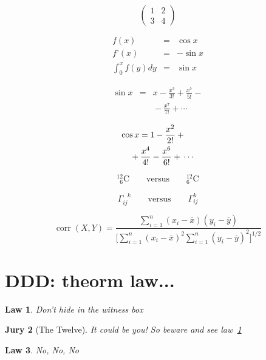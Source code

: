 \documentclass{article}
\begin{document}
\begin{displaymath}
\left(\begin{array}{c|c}
1 & 2 \\
\hline
3 & 4
\end{array}\right)
\end{displaymath}

\begin{eqnarray}
f(x) & = & \cos x
\\
f’(x) & = & -\sin x
\\
\int_{0}^{x} f(y)dy &
= & \sin x
\end{eqnarray}

{\setlength\arraycolsep{2pt}
\begin{eqnarray}
\sin x & = & x -\frac{x^{3}}{3!}
+\frac{x^{5}}{5!}-{}
\nonumber\\
& & {}-\frac{x^{7}}{7!}+{}\cdots
\end{eqnarray}}

\begin{eqnarray}
\lefteqn{ \cos x = 1
-\frac{x^{2}}{2!} +{} }
\nonumber\\
& & {}+\frac{x^{4}}{4!}
-\frac{x^{6}}{6!}+{}\cdots
\end{eqnarray}

\begin{displaymath}
{}^{12}_{\phantom{1}6}\textrm{C}
\qquad \textrm{versus} \qquad
{}^{12}_{6}\textrm{C}
\end{displaymath}


\begin{displaymath}
\Gamma_{ij}^{\phantom{ij}k}
\qquad \textrm{versus} \qquad
\Gamma_{ij}^{k}
\end{displaymath}

\begin{displaymath}
\mathop{\mathrm{corr}}(X,Y)=
\frac{\displaystyle
\sum_{i=1}^n(x_i-\overline x)
(y_i-\overline y)}
{\displaystyle\biggl[
\sum_{i=1}^n(x_i-\overline x)^2
\sum_{i=1}^n(y_i-\overline y)^2
\biggr]^{1/2}}
\end{displaymath}


\section{DDD: theorm law...}

\newtheorem{law}{Law}
\newtheorem{jury}[law]{Jury}
\begin{law} \label{law:box}
Don’t hide in the witness box
\end{law}
\begin{jury}[The Twelve]
It could be you! So beware and
see law~\ref{law:box}\end{jury}
\begin{law}No, No, No\end{law}
\end{document}
